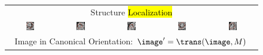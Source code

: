 \begin{figure}
\begin{center}
\begin{tabular}{ccccc}
\multicolumn{5}{c}{Structure \hl{Localization}} \\

\includegraphics[width=0.19\textwidth]{./data/ohm/control/HCMNet_1100594/00_SAX/35_/im_det.png} &
\includegraphics[width=0.19\textwidth]{./data/ohm/control/HCMNet_1100823/00_SAX/33_/im_det.png} &
\includegraphics[width=0.19\textwidth]{./data/ohm/control/HCMNet_2600035/00_SAX/024_SA_CINE/im_det.png} &
\includegraphics[width=0.19\textwidth]{./data/ohm/control/HCMNet_1700012/01_HLA/00/im_det.png} &
\includegraphics[width=0.19\textwidth]{./data/ohm/control/HCMNet_2100096/02_VLA/00/im_det.png} \\

\multicolumn{5}{c}{Image in Canonical Orientation: $\image^\prime = \trans(\image,M)$} \\


\end{tabular}
\end{center}
\end{figure}
